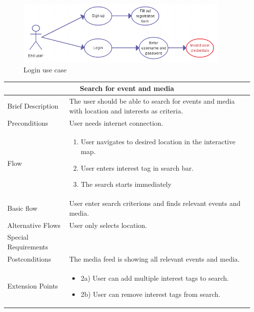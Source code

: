 \begin{figure}[ht!]
\centering
\includegraphics[width=105mm]{./SystemRequirements/img/loginUC.png}
\caption{Login use case \label{fig:SysReqUseCasesLogin}}
\end{figure}

\begin{minipage}{\linewidth}
\begin{tabular}{|l|p{85mm}|}
  \hline
  \multicolumn{2}{|c|}{\cellcolor{gray!25} \textbf{Search for event and media}} \\
  \hline
  Brief Description & The user should be able to search for events and media with location and interests as criteria.\\
  Preconditions & User needs internet connection.\\
  Flow &
    \begin{enumerate}
      \item User navigates to desired location in the interactive map.
      \item User enters interest tag in search bar.
      \item The search starts immediately
    \end{enumerate} \\
  Basic flow & User enter search criterions and finds relevant events and media. \\
  Alternative Flows & User only selects location.\\
  Special Requirements & \\
  Postconditions & The media feed is showing all relevant events and media. \\
  Extension Points & 
    \begin{itemize}
      \item 2a) User can add multiple interest tags to search. 
      \item 2b) User can remove interest tags from search. 
    \end{itemize} \\
  \hline
\end{tabular}
\end{minipage}

